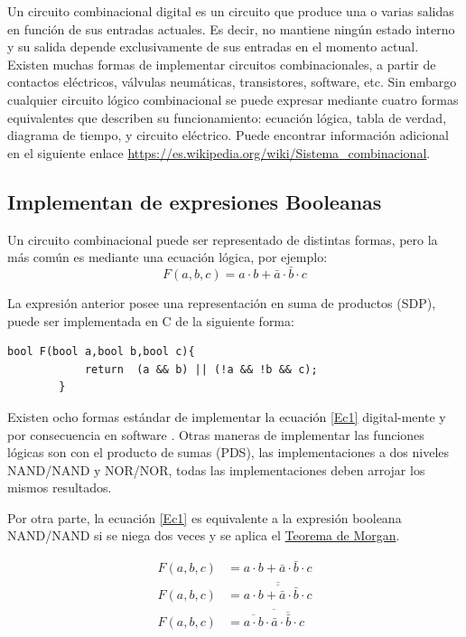 Un circuito combinacional digital es un circuito que produce una o varias salidas en función de sus entradas actuales. Es decir, no mantiene ningún estado interno y su salida depende exclusivamente de sus entradas en el momento actual.
Existen muchas formas de implementar circuitos combinacionales, a partir de contactos eléctricos, válvulas neumáticas, transistores, software, etc. Sin embargo cualquier circuito lógico combinacional se puede expresar mediante cuatro formas equivalentes que describen su funcionamiento: ecuación lógica, tabla de verdad, diagrama de tiempo, y circuito eléctrico. 
Puede encontrar información adicional en el siguiente enlace \href{https://es.wikipedia.org/wiki/Sistema_combinacional}{https://es.wikipedia.org/wiki/Sistema\_combinacional}.   

\subsection{Implementan de expresiones Booleanas }

Un circuito combinacional  puede ser representado de distintas formas, pero la más común es mediante una ecuación lógica, por ejemplo: 
\begin{equation}
\label{Ec1}
F(a,b,c)=a\cdot b+\bar{a}\cdot \bar{b}\cdot c
\end{equation}

La expresión anterior posee una representación en suma de productos (SDP), puede ser implementada en C de la siguiente forma:

		 \begin{lstlisting}[language=Arduino,numbers=none, showstringspaces=false]
		bool F(bool a,bool b,bool c){
			return  (a && b) || (!a && !b && c);
		}
		\end{lstlisting} 

Existen ocho formas estándar de implementar la ecuación \eqref{Ec1} digital-mente y por consecuencia en software . Otras maneras de implementar las funciones lógicas  son con el producto de sumas (PDS), las implementaciones a dos niveles  NAND/NAND y NOR/NOR, todas las implementaciones deben arrojar los mismos resultados.

Por otra parte, la ecuación \eqref{Ec1} es equivalente a la expresión booleana  NAND/NAND si se niega dos veces y se aplica el \href{https://es.wikipedia.org/wiki/Leyes_de_De_Morgan}{Teorema de Morgan}.


\begin{align}
\label{Ec2}
F(a,b,c)&=a\cdot b+\bar{a}\cdot \bar{b} \cdot c \\
F(a,b,c)&=\overline{\overline{a\cdot b+\bar{a}\cdot \bar{b}\cdot c}} \\  \label{Ec3}
F(a,b,c)&=\overline{\overline{a\cdot b}\cdot\overline{\bar{a}\cdot \bar{b}\cdot c}}
\end{align}


